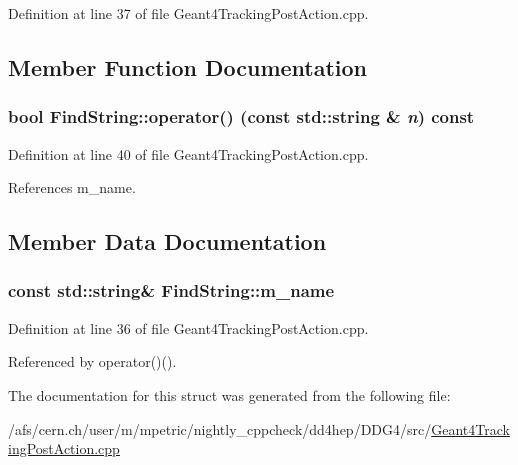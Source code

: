 Definition at line 37 of file Geant4TrackingPostAction.cpp.

\subsection{Member Function Documentation}
\hypertarget{struct_find_string_a3cd8eb0bfd5c953d9df1db4344330237}{
\subsubsection[{operator()}]{\setlength{\rightskip}{0pt plus 5cm}bool FindString::operator() (const std::string \& {\em n}) const}}
\label{struct_find_string_a3cd8eb0bfd5c953d9df1db4344330237}


Definition at line 40 of file Geant4TrackingPostAction.cpp.

References m\_\-name.

\subsection{Member Data Documentation}
\hypertarget{struct_find_string_a7acb1627655d24666e9107df3b60441a}{
\subsubsection[{m\_\-name}]{\setlength{\rightskip}{0pt plus 5cm}const std::string\& {\bf FindString::m\_\-name}}}
\label{struct_find_string_a7acb1627655d24666e9107df3b60441a}


Definition at line 36 of file Geant4TrackingPostAction.cpp.

Referenced by operator()().

The documentation for this struct was generated from the following file:\begin{DoxyCompactItemize}
\item 
/afs/cern.ch/user/m/mpetric/nightly\_\-cppcheck/dd4hep/DDG4/src/\hyperlink{_geant4_tracking_post_action_8cpp}{Geant4TrackingPostAction.cpp}\end{DoxyCompactItemize}
